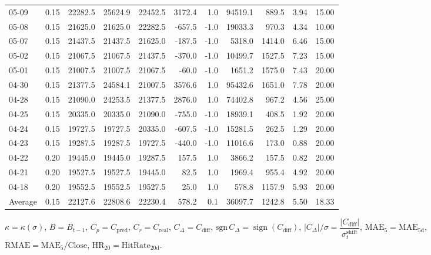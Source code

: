 \begin{threeparttable}
{\begin{tabular}{lrrrrrrrrrr}
05-09 & 0.15 & 22282.5 & 25624.9 & 22452.5 & 3172.4 & 1.0 & 94519.1 & 889.5 & 3.94 & 15.00 \\
05-08 & 0.15 & 21625.0 & 21625.0 & 22282.5 & -657.5 & -1.0 & 19033.3 & 970.3 & 4.34 & 10.00 \\
05-07 & 0.15 & 21437.5 & 21437.5 & 21625.0 & -187.5 & -1.0 & 5318.0 & 1414.0 & 6.46 & 15.00 \\
05-02 & 0.15 & 21067.5 & 21067.5 & 21437.5 & -370.0 & -1.0 & 10499.7 & 1527.5 & 7.23 & 15.00 \\
05-01 & 0.15 & 21007.5 & 21007.5 & 21067.5 & -60.0 & -1.0 & 1651.2 & 1575.0 & 7.43 & 20.00 \\
04-30 & 0.15 & 21377.5 & 24584.1 & 21007.5 & 3576.6 & 1.0 & 95432.6 & 1651.0 & 7.78 & 20.00 \\
04-28 & 0.15 & 21090.0 & 24253.5 & 21377.5 & 2876.0 & 1.0 & 74402.8 & 967.2 & 4.56 & 25.00 \\
04-25 & 0.15 & 20335.0 & 20335.0 & 21090.0 & -755.0 & -1.0 & 18939.1 & 408.5 & 1.92 & 20.00 \\
04-24 & 0.15 & 19727.5 & 19727.5 & 20335.0 & -607.5 & -1.0 & 15281.5 & 262.5 & 1.29 & 20.00 \\
04-23 & 0.15 & 19287.5 & 19287.5 & 19727.5 & -440.0 & -1.0 & 11016.6 & 173.0 & 0.88 & 20.00 \\
04-22 & 0.20 & 19445.0 & 19445.0 & 19287.5 & 157.5 & 1.0 & 3866.2 & 157.5 & 0.82 & 20.00 \\
04-21 & 0.20 & 19527.5 & 19527.5 & 19445.0 & 82.5 & 1.0 & 1969.4 & 955.4 & 4.92 & 20.00 \\
04-18 & 0.20 & 19552.5 & 19552.5 & 19527.5 & 25.0 & 1.0 & 578.8 & 1157.9 & 5.93 & 20.00 \\
Average & 0.15 & 22127.6 & 22808.6 & 22230.4 & 578.2 & 0.1 & 36097.7 & 1242.8 & 5.50 & 18.33 \\
\bottomrule
\end{tabular}
}%
\begin{tablenotes}\footnotesize
\item $\kappa=\kappa(\sigma)$, $B=B_{t-1}$, $C_p=C_{\text{pred}}$, $C_r=C_{\text{real}}$, $C_\Delta=C_{\text{diff}}$, $\mathrm{sgn}\,C_\Delta=\operatorname{sign}(C_{\text{diff}})$, $|C_\Delta|/\sigma=\dfrac{|C_{\text{diff}}|}{\sigma_t^{\text{shift}}}$, $\mathrm{MAE}_5=\mathrm{MAE}_{5\text{d}}$, $\mathrm{RMAE}= \mathrm{MAE}_5 / \text{Close}$, $\mathrm{HR}_{20}=\mathrm{HitRate}_{20\text{d}}$.
\end{tablenotes}
\end{threeparttable}
\endgroup